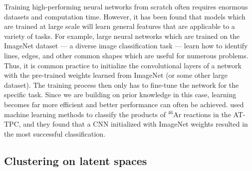 \documentclass[review,number,sort&compress]{elsarticle}
\begin{document}


Training high-performing neural networks from scratch often requires enormous datasets and computation time. However, it has been found that models which are trained at large scale will learn general features that are applicable to a variety of tasks. For example, large neural networks which are trained on the ImageNet dataset \cite{Russakovsky2015} --- a diverse image classification task --- learn how to identify lines, edges, and other common shapes which are useful for numerous problems. Thus, it is common practice to initialize the convolutional layers of a network with the pre-trained weights learned from ImageNet (or some other large dataset). The training process then only has to fine-tune the network for the specific task. Since we are building on prior knowledge in this case, learning becomes far more efficient and better performance can often be achieved. \citet{Kuchera2019} used machine learning methods to classify the products of $^{46}$Ar reactions in the AT-TPC, and they found that a CNN initialized with ImageNet weights resulted in the most successful classification.

\subsection{Clustering on latent spaces}

\end{document}
